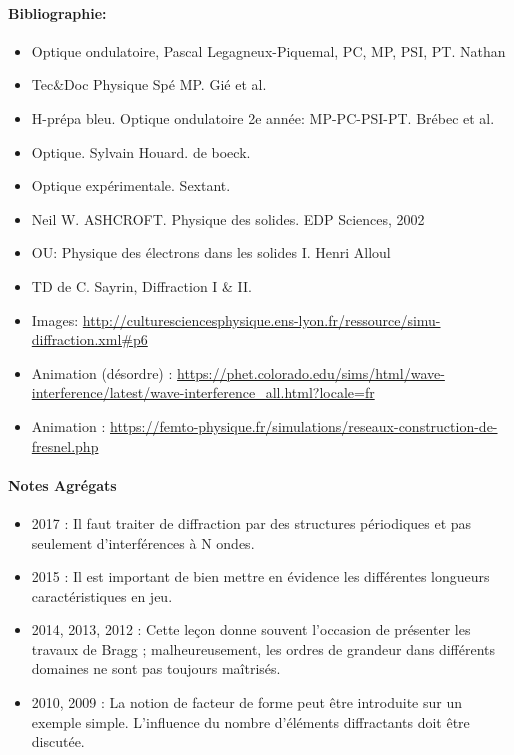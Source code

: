 \documentclass[11pt]{report}
\numberwithin{figure}{section}
\numberwithin{equation}{section}
\numberwithin{table}{section}
\newcommand{\1}{\boldsymbol{1}}
\begin{document}
\paragraph*{Bibliographie:} 
\begin{itemize}
\item Optique ondulatoire, Pascal Legagneux-Piquemal, PC, MP, PSI, PT. Nathan
\item  Tec\&Doc Physique Spé MP. Gié et al.
\item H-prépa bleu. Optique ondulatoire 2e année: MP-PC-PSI-PT. Brébec et al.
\item Optique. Sylvain Houard. de boeck.
\item Optique expérimentale. Sextant.
\item Neil W. ASHCROFT. Physique des solides. EDP Sciences, 2002
\item OU: Physique des électrons dans les solides I. Henri Alloul
\item TD de C. Sayrin, Diffraction I \& II.
\item Images: \url{http://culturesciencesphysique.ens-lyon.fr/ressource/simu-diffraction.xml#p6}
\item Animation (désordre) : \url{https://phet.colorado.edu/sims/html/wave-interference/latest/wave-interference_all.html?locale=fr}
\item Animation : \url{https://femto-physique.fr/simulations/reseaux-construction-de-fresnel.php}
\end{itemize}

\paragraph{Notes Agrégats}

\begin{itemize}
\item 2017 : Il faut traiter de diffraction par des structures périodiques et pas seulement d'interférences
à N ondes.
\item 2015 : Il est important de bien mettre en évidence les différentes longueurs caractéristiques
en jeu.
\item 2014, 2013, 2012 : Cette leçon donne souvent l'occasion de présenter les travaux de Bragg ;
malheureusement, les ordres de grandeur dans différents domaines ne sont pas toujours
maîtrisés.
\item 2010, 2009 : La notion de facteur de forme peut être introduite sur un exemple simple.
L'influence du nombre d'éléments diffractants doit être discutée.
\end{itemize}
\end{document}
